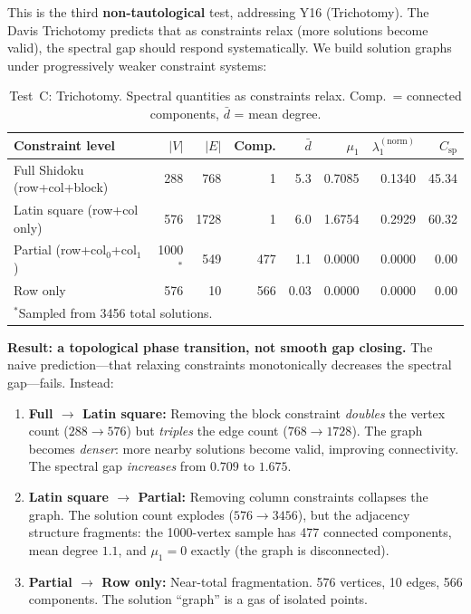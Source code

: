 \documentclass[11pt]{article}
\theoremstyle{definition}
\theoremstyle{remark}
\newcommand{\Csp}{C_{\mathrm{sp}}}
\begin{document}
This is the third \textbf{non-tautological} test, addressing Y16 (Trichotomy). The Davis Trichotomy predicts that as constraints relax (more solutions become valid), the spectral gap should respond systematically. We build solution graphs under progressively weaker constraint systems:

\begin{table}[h]
\centering
\begin{tabular}{l r r r r r r r}
\toprule
Constraint level & $|V|$ & $|E|$ & Comp. & $\bar{d}$ & $\mu_1$ & $\lambda_1^{(\mathrm{norm})}$ & $\Csp$ \\
\midrule
Full Shidoku (row+col+block) & 288 & 768 & 1 & 5.3 & 0.7085 & 0.1340 & 45.34 \\
Latin square (row+col only) & 576 & 1728 & 1 & 6.0 & 1.6754 & 0.2929 & 60.32 \\
Partial (row+col$_0$+col$_1$) & 1000$^*$ & 549 & 477 & 1.1 & 0.0000 & 0.0000 & 0.00 \\
Row only & 576 & 10 & 566 & 0.03 & 0.0000 & 0.0000 & 0.00 \\
\bottomrule
\multicolumn{8}{l}{\footnotesize $^*$Sampled from 3456 total solutions.}
\end{tabular}
\caption{Test~C: Trichotomy. Spectral quantities as constraints relax. Comp.\ = connected components, $\bar{d}$ = mean degree.}
\label{tab:testC}
\end{table}

\textbf{Result: a topological phase transition, not smooth gap closing.} The naive prediction---that relaxing constraints monotonically decreases the spectral gap---fails. Instead:

\begin{enumerate}[nosep]
\item \textbf{Full $\to$ Latin square:} Removing the block constraint \emph{doubles} the vertex count ($288 \to 576$) but \emph{triples} the edge count ($768 \to 1728$). The graph becomes \emph{denser}: more nearby solutions become valid, improving connectivity. The spectral gap \emph{increases} from $0.709$ to $1.675$.

\item \textbf{Latin square $\to$ Partial:} Removing column constraints collapses the graph. The solution count explodes ($576 \to 3456$), but the adjacency structure fragments: the 1000-vertex sample has 477 connected components, mean degree $1.1$, and $\mu_1 = 0$ exactly (the graph is disconnected).

\item \textbf{Partial $\to$ Row only:} Near-total fragmentation. 576 vertices, 10 edges, 566 components. The solution ``graph'' is a gas of isolated points.
\end{enumerate}
\end{document}
